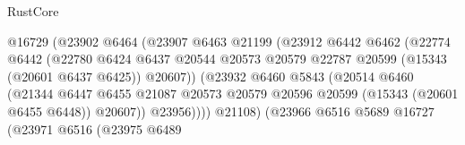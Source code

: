 \begin{lexlean}{RustCore}
\begin{coremodule}
                                          @16729
                                          (@23902
                                            @6464
                                            (@23907
                                              @6463
                                              @21199
                                              (@23912
                                                @6442
                                                @6462
                                                (@22774
                                                  @6442
                                                  (@22780
                                                    @6424
                                                    @6437
                                                    @20544
                                                    @20573
                                                    @20579
                                                    @22787
                                                    @20599
                                                    (@15343 (@20601 @6437 @6425))
                                                    @20607))
                                                (@23932
                                                  @6460
                                                  @5843
                                                  (@20514
                                                    @6460
                                                    (@21344
                                                      @6447
                                                      @6455
                                                      @21087
                                                      @20573
                                                      @20579
                                                      @20596
                                                      @20599
                                                      (@15343 (@20601 @6455 @6448))
                                                      @20607))
                                                  @23956))))
                                          @21108)
                                        (@23966
                                          @6516
                                          @5689
                                          @16727
                                          (@23971
                                            @6516
                                            (@23975
                                              @6489

\end{coremodule}
\end{lexlean}
